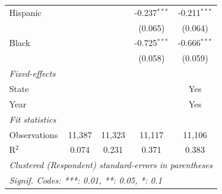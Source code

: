 \begin{tabular}{lcccc}
   Hispanic                       &                &                & -0.237$^{***}$ & -0.211$^{***}$\\   
                                  &                &                & (0.065)        & (0.064)\\   
   Black                          &                &                & -0.725$^{***}$ & -0.666$^{***}$\\   
                                  &                &                & (0.058)        & (0.059)\\   
   \midrule
   \emph{Fixed-effects}\\
   State                          &                &                &                & Yes\\  
   Year                           &                &                &                & Yes\\  
   \midrule
   \emph{Fit statistics}\\
   Observations                   & 11,387         & 11,323         & 11,117         & 11,106\\  
   R$^2$                          & 0.074          & 0.231          & 0.371          & 0.383\\  
   \midrule \midrule
   \multicolumn{5}{l}{\emph{Clustered (Respondent) standard-errors in parentheses}}\\
   \multicolumn{5}{l}{\emph{Signif. Codes: ***: 0.01, **: 0.05, *: 0.1}}\\
\end{tabular}
\par\endgroup


